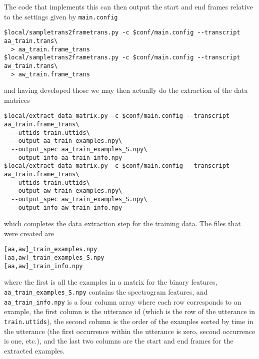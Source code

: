\documentclass{article}
\begin{document}
The code that implements this can then output the start and end
frames relative to the settings given by \texttt{main.config}
\begin{verbatim}
$local/sampletrans2frametrans.py -c $conf/main.config --transcript aa_train.trans\
  > aa_train.frame_trans
$local/sampletrans2frametrans.py -c $conf/main.config --transcript aw_train.trans\
  > aw_train.frame_trans
\end{verbatim}
and having developed those we may then actually do the extraction
of the data matrices
\begin{verbatim}
$local/extract_data_matrix.py -c $conf/main.config --transcript aa_train.frame_trans\
  --uttids train.uttids\
  --output aa_train_examples.npy\
  --output_spec aa_train_examples_S.npy\
  --output_info aa_train_info.npy
$local/extract_data_matrix.py -c $conf/main.config --transcript aw_train.frame_trans\
  --uttids train.uttids\
  --output aw_train_examples.npy\
  --output_spec aw_train_examples_S.npy\
  --output_info aw_train_info.npy
\end{verbatim}
which completes the data extraction step for the training data. The files that were created are
\begin{verbatim}
[aa,aw]_train_examples.npy
[aa,aw]_train_examples_S.npy
[aa,aw]_train_info.npy
\end{verbatim}
where the first is all the examples in a matrix for the binary
features, \texttt{aa\_train\_examples\_S.npy} contains the spectrogram
features, and
\texttt{aa\_train\_info.npy} is a four column array where each 
row corresponds to an example, the first column is the utterance
id (which is the row of the utterance in \texttt{train.uttids}),
the second column is the order of the examples sorted by time in the utterance
(the first occurrence within the utterance is zero,
second occurrence is one, etc.), and the last two columns are the
start and end frames for the extracted examples.
\end{document}
